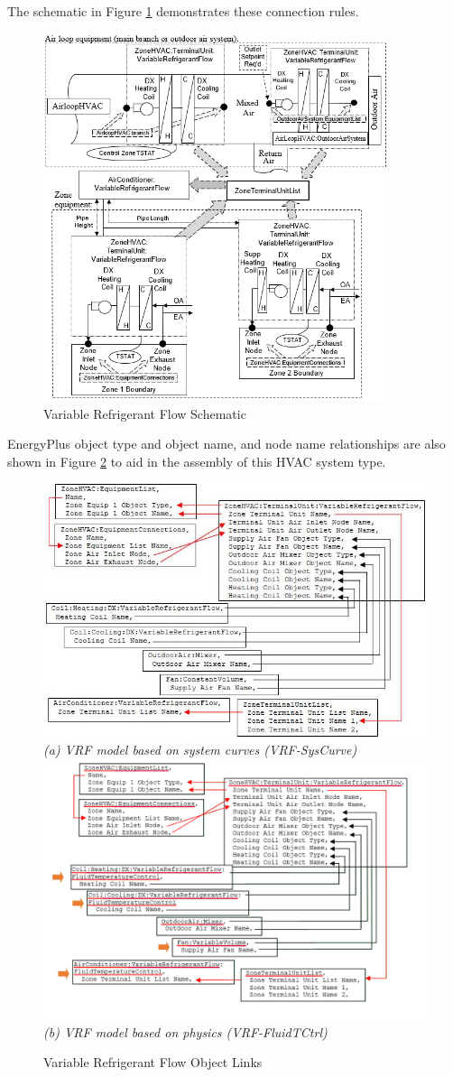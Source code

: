 The schematic in Figure \ref{fig:variable-refrigerant-flow-schematic} demonstrates these connection rules.

\begin{figure}[hbtp] %
\centering
\includegraphics[width=0.9\textwidth, height=0.9\textheight, keepaspectratio=true]{media/image310.png}
\caption{Variable Refrigerant Flow Schematic \protect \label{fig:variable-refrigerant-flow-schematic}}
\end{figure}

EnergyPlus object type and object name, and node name relationships are also shown in Figure \ref{fig:variable-refrigerant-flow-object-links} to aid in the assembly of this HVAC system type.

\begin{figure}[hbtp]
\centering
\includegraphics[width=0.5\linewidth]{media/image311.png}
\emph{(a) VRF model based on system curves (VRF-SysCurve)}
\includegraphics[width=0.5\linewidth]{media/image312.png}
\emph{(b) VRF model based on physics (VRF-FluidTCtrl)}
\caption{Variable Refrigerant Flow Object Links \protect \label{fig:variable-refrigerant-flow-object-links}}
\end{figure}

